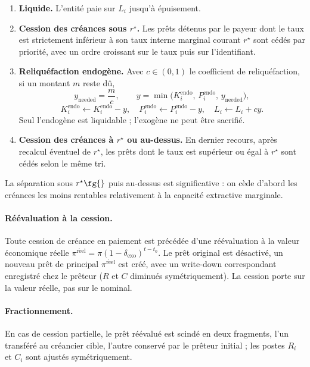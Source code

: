 \documentclass[11pt,a4paper]{article}
\begin{document}
\begin{enumerate}
    \item \textbf{Liquide.} L'entité paie sur \(L_i\) jusqu'à épuisement.
    \item \textbf{Cession des créances sous \(r^\star\).} Les prêts détenus par le payeur dont le taux est strictement inférieur à son taux interne marginal courant \(r^\star\) sont cédés par priorité, avec un ordre croissant sur le taux puis sur l'identifiant.
    \item \textbf{Reliquéfaction endogène.} Avec \(c\in(0,1)\) le coefficient de reliquéfaction, si un montant \(m\) reste dû,
    \[
    y_{\mathrm{needed}}=\frac{m}{c},\qquad
    y = \min\!\bigl(K_i^{\mathrm{endo}},\,P_i^{\mathrm{endo}},\,y_{\mathrm{needed}}\bigr),
    \]
    \[
    K_i^{\mathrm{endo}}\leftarrow K_i^{\mathrm{endo}}-y,\quad
    P_i^{\mathrm{endo}}\leftarrow P_i^{\mathrm{endo}}-y,\quad
    L_i\leftarrow L_i + cy.
    \]
    Seul l'endogène est liquidable ; l'exogène ne peut être sacrifié.
    \item \textbf{Cession des créances à \(r^\star\) ou au-dessus.} En dernier recours, après recalcul éventuel de \(r^\star\), les prêts dont le taux est supérieur ou égal à \(r^\star\) sont cédés selon le même tri.
\end{enumerate}

La séparation \og sous \(r^\star\fg{}\) puis \og au-dessus \fg{} est significative : on cède d'abord les créances les moins rentables relativement à la capacité extractive marginale.

\paragraph{Réévaluation à la cession.} Toute cession de créance en paiement est précédée d'une réévaluation à la valeur économique réelle \(\pi^{\mathrm{r\acute eel}}=\pi(1-\delta_{\mathrm{exo}})^{t-t_0}\). Le prêt original est désactivé, un nouveau prêt de principal \(\pi^{\mathrm{r\acute eel}}\) est créé, avec un write-down correspondant enregistré chez le prêteur (\(R\) et \(C\) diminués symétriquement). La cession porte sur la valeur réelle, pas sur le nominal.

\paragraph{Fractionnement.} En cas de cession partielle, le prêt réévalué est scindé en deux fragments, l'un transféré au créancier cible, l'autre conservé par le prêteur initial ; les postes \(R_i\) et \(C_i\) sont ajustés symétriquement.
\end{document}
